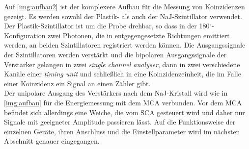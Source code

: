 Auf \autoref{img:aufbau2} ist der komplexere Aufbau für die Messung von Koinzidenzen gezeigt.
Es werden sowohl der Plastik- als auch der NaJ-Szintillator verwendet.
Der Plastik-Szintillator ist um die Probe drehbar, so dass in der 180$^\circ$-Konfiguration zwei
Photonen, die in entgegengesetzte Richtungen emittiert werden, an beiden Szintillatoren registriert werden können.
Die Ausgangssignale der Szintillatoren werden verstärkt und die
bipolaren Ausgangssignale der Verstärker gelangen in zwei \emph{single channel analyser},
dann in zwei verschiedene Kanäle einer \emph{timing unit} und schließlich in eine Koinzidenzeinheit,
die im Falle einer Koinzidenz ein Signal an einen Zähler gibt.\\
Der unipolare Ausgang des Verstärkers nach dem NaJ-Kristall wird wie in \autoref{img:aufbau}
für die Energiemessung mit dem MCA verbunden. Vor dem MCA befindet sich allerdings eine Weiche,
die vom SCA gesteuert wird und daher nur Signale mit geeigneter Amplitude passieren lässt.
Auf die Funktionsweise der einzelnen Geräte, ihren Anschluss und die Einstellparameter
wird im nächsten Abschnitt genauer eingegangen.



